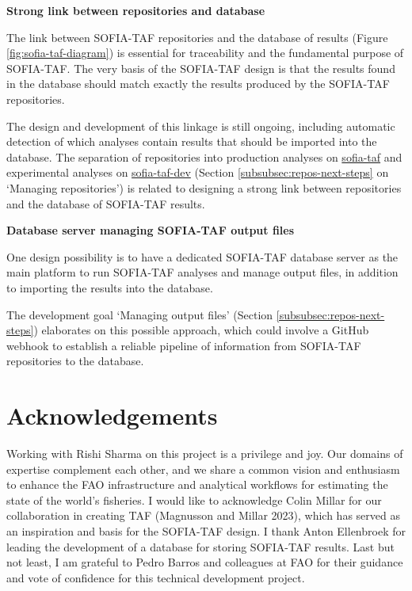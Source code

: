 \documentclass[12pt]{article}
\newcommand\blue[1]{\textcolor{darkblue}{#1}}
\begin{document}
\textbf{Strong link between repositories and database}

The link between SOFIA-TAF repositories and the database of results (Figure
\ref{fig:sofia-taf-diagram}) is essential for traceability and the fundamental
purpose of SOFIA-TAF. The very basis of the SOFIA-TAF design is that the results
found in the database should match exactly the results produced by the SOFIA-TAF
repositories.

The design and development of this linkage is still ongoing, including automatic
detection of which analyses contain results that should be imported into the
database. The separation of repositories into production analyses on
\blue{\href{https://github.com/sofia-taf}{\sf sofia-taf}} and experimental
analyses on \blue{\href{https://github.com/sofia-taf-dev}{\sf sofia-taf-dev}}
(Section \ref{subsubsec:repos-next-steps} on `Managing repositories') is related
to designing a strong link between repositories and the database of SOFIA-TAF
results.

\textbf{Database server managing SOFIA-TAF output files}

One design possibility is to have a dedicated SOFIA-TAF database server as the
main platform to run SOFIA-TAF analyses and manage output files, in addition to
importing the results into the database.

The development goal `Managing output files' (Section
\ref{subsubsec:repos-next-steps}) elaborates on this possible approach, which
could involve a GitHub webhook to establish a reliable pipeline of information
from SOFIA-TAF repositories to the database.

\vspace{3ex}

\section{Acknowledgements}

Working with Rishi Sharma on this project is a privilege and joy. Our domains of
expertise complement each other, and we share a common vision and enthusiasm to
enhance the FAO infrastructure and analytical workflows for estimating the state
of the world's fisheries. I would like to acknowledge Colin Millar for our
collaboration in creating TAF (Magnusson and Millar 2023), which has served as
an inspiration and basis for the SOFIA-TAF design. I thank Anton Ellenbroek for
leading the development of a database for storing SOFIA-TAF results. Last but
not least, I am grateful to Pedro Barros and colleagues at FAO for their
guidance and vote of confidence for this technical development project.
\end{document}
